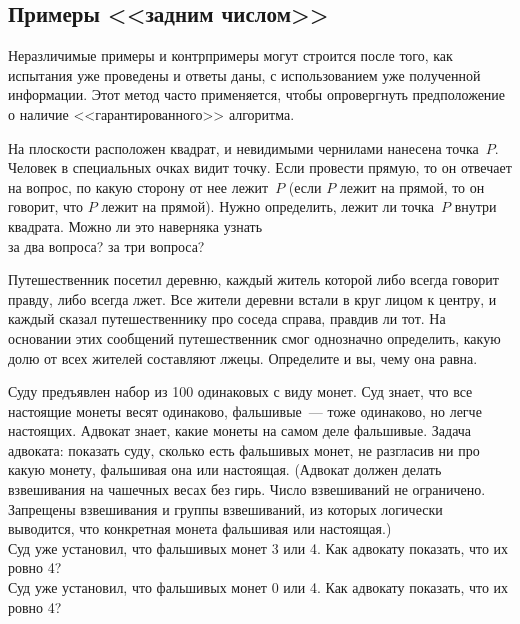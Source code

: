 \subsection*{Примеры <<задним числом>>}
Неразличимые примеры и контрпримеры могут строится после того, как испытания
уже проведены и ответы даны, с использованием уже полученной информации.
Этот метод часто применяется, чтобы опровергнуть предположение о наличие
<<гарантированного>> алгоритма.

\begin{problems}

\item
На плоскости расположен квадрат, и невидимыми чернилами нанесена точка~$P$.
Человек в специальных очках видит точку.
Если провести прямую, то он отвечает на вопрос, по какую сторону от нее
лежит~$P$ (если $P$ лежит на прямой, то он говорит, что $P$ лежит на прямой).
Нужно определить, лежит ли точка~$P$ внутри квадрата.
Можно ли это наверняка узнать
\\
\subproblem за два вопроса?
\qquad
\subproblem за три вопроса?

\item
Путешественник посетил деревню, каждый житель которой либо всегда говорит
правду, либо всегда лжет.
Все жители деревни встали в круг лицом к центру, и каждый сказал
путешественнику про соседа справа, правдив ли тот.
На основании этих сообщений путешественник смог однозначно определить, какую
долю от всех жителей составляют лжецы.
Определите и вы, чему она равна.

\item
Суду предъявлен набор из 100 одинаковых с виду монет.
Суд знает, что все настоящие монеты весят одинаково, фальшивые~--- тоже
одинаково, но легче настоящих.
Адвокат знает, какие монеты на самом деле фальшивые.
Задача адвоката: показать суду, сколько есть фальшивых монет, не разгласив
ни про какую монету, фальшивая она или настоящая.
(Адвокат должен делать взвешивания на чашечных весах без гирь.
Число взвешиваний не ограничено.
Запрещены взвешивания и группы взвешиваний, из которых логически выводится, что
конкретная монета фальшивая или настоящая.)
\\
\subproblem
Суд уже установил, что фальшивых монет 3 или 4.
Как адвокату показать, что их ровно 4?
\\
\subproblem
Суд уже установил, что фальшивых монет 0 или 4.
Как адвокату показать, что их ровно 4?

\end{problems}

